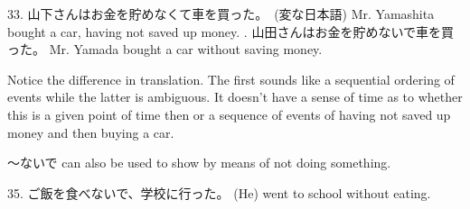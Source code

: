 \par{33. 山下さんはお金を貯めなくて車を買った。　(変な日本語) \hfill\break
Mr. Yamashita bought a car, having not saved up money. \hfill\break
\hfill{}. 山田さんはお金を貯めないで車を買った。 \hfill\break
Mr. Yamada bought a car without saving money. }

\par{ Notice the difference in translation. The first sounds like a sequential ordering of events while the latter is ambiguous. It doesn't have a sense of time as to whether this is a given point of time then or a sequence of events of having not saved up money and then buying a car. }

\par{ ～ないで can also be used to show by means of not doing something. }

\par{35. ご飯を食べないで、学校に行った。 \hfill\break
(He) went to school without eating. }
    